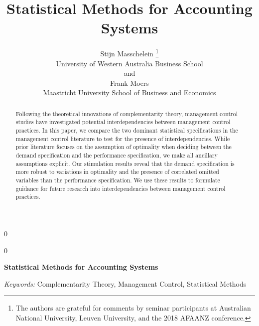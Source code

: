 \documentclass[12pt]{article}
\newcommand{\blind}{0}
\begin{document}
\def\spacingset#1{\renewcommand{\baselinestretch}%
{#1}\small\normalsize} \spacingset{1}


\blind
{
  \title{\bf Statistical Methods for Accounting Systems}

  \author{
        Stijn Masschelein \thanks{The authors are grateful for comments by seminar participants at
Australian National University, Leuven University, and the 2018 AFAANZ
conference.} \\
    University of Western Australia Business School\\
     and \\     Frank Moers \\
    Maastricht University School of Business and Economics\\
      }
  \maketitle
} \fi

\blind
{
  \bigskip
  \bigskip
  \bigskip
  \begin{center}
    {\LARGE\bf Statistical Methods for Accounting Systems}
  \end{center}
  \medskip
} \fi

\bigskip
\begin{abstract}
Following the theoretical innovations of complementarity theory, management control studies have investigated potential interdependencies between management control practices. In this paper, we compare the two dominant statistical specifications in the management control literature to test for the presence of interdependencies. While prior literature focuses on the assumption of optimality when deciding between the demand specification and the performance specification, we make all ancillary assumptions explicit. Our stimulation results reveal that the demand specification is more robust to variations in optimality and the presence of correlated omitted variables than the performance specification. We use these results to formulate guidance for future research into interdependencies between management control practices.
\end{abstract}

\noindent%
{\it Keywords:} Complementarity Theory, Management Control, Statistical Methods
\vfill

\newpage

\spacingset{1.15}
\end{document}
